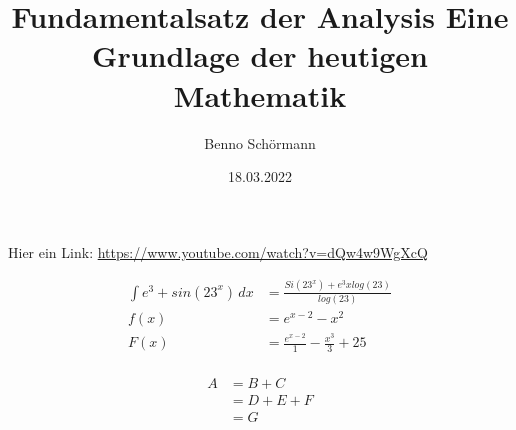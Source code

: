 \documentclass[12pt,a4paper,draft]{article}
\begin{document}
\title{Fundamentalsatz der Analysis\newline
\newline Eine Grundlage der heutigen Mathematik}
\author{Benno Schörmann}
\date{18.03.2022}

\maketitle
Hier ein Link: \url{https://www.youtube.com/watch?v=dQw4w9WgXcQ} \newline

\begin{equation}
	\begin{aligned}
		\int {e}^{3}+sin({23}^{x}) \,dx & = \frac{Si({23}^{x})+{e}^{3}xlog(23)}{log(23)}\\
		f(x) & ={e}^{x-2}-{x}^{2}\\
		F(x) & =\frac{{e}^{x-2}}{1}-\frac{{x}^{3}}{3}+25\\
	\end{aligned}
\end{equation}

\begin{equation}
	\begin{aligned}
		A & = B + C\\
		  & = D + E + F\\
		  & = G
	\end{aligned}
\end{equation}
\end{document}
